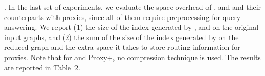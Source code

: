 

.
In the last set of experiments, we evaluate the space overhead of \arcflag, \tnr and \ah and their counterparts with proxies, since all of them require preprocessing for query answering. We report (1) the size of the index generated by \arcflag, \tnr and \ah on the original input graphs, and (2) the sum of the size of the index generated by \ah on the reduced graph and the extra space it takes to store routing information for proxies. Note that for \tnr and Proxy+\tnr, no compression technique is used. The results are reported in Table~2.

